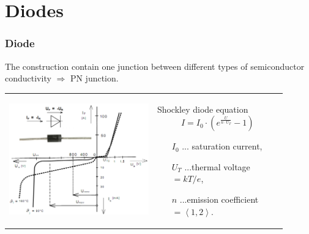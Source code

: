 \documentclass{beamer}
\begin{document}
\section{\texorpdfstring{Diodes}{Diodes}}
	\begin{frame}
    \frametitle{Diode}
		The construction contain one junction between different types of semiconductor conductivity $\Rightarrow$ PN junction.
		\begin{center}
			\begin{tabular}{m{0.48\linewidth} m{0.42\linewidth}}
			\includegraphics[scale=0.20]{obr04_dioda.png} &
			Shockley diode equation
			$$I = I_0\cdot\left(e^{\frac{U}{n\cdot U_T}}-1\right)$$
			\small
			\begin{itemize}
				\item[$I_0$] ... saturation current,
				\item[$U_T$] ...thermal voltage $=kT/e$,
				\item[$n$] ...emission coefficient $=\left\langle 1, 2\right\rangle$.
			\end{itemize}
			
			\end{tabular}
		\end{center}
	\end{frame}
\end{document}
